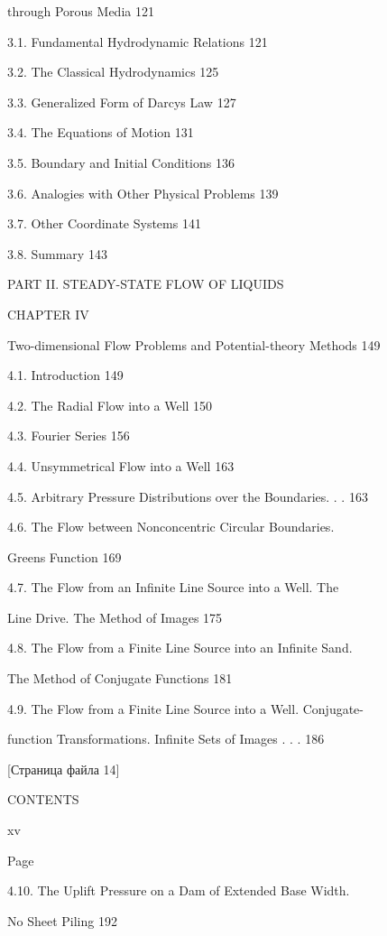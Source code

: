 \documentclass[
  11pt,
]{article}
\begin{document}
through Porous Media 121 \par
3.1. Fundamental Hydrodynamic Relations 121 \par
3.2. The Classical Hydrodynamics 125 \par
3.3. Generalized Form of Darcy\textquotesingle s Law 127 \par
3.4. The Equations of Motion 131 \par
3.5. Boundary and Initial Conditions 136 \par
3.6. Analogies with Other Physical Problems 139 \par
3.7. Other Coordinate Systems 141 \par
3.8. Summary 143 \par
PART II. STEADY-STATE FLOW OF LIQUIDS \par
CHAPTER IV \par
Two-dimensional Flow Problems and Potential-theory Methods 149 \par
4.1. Introduction 149 \par
4.2. The Radial Flow into a Well 150 \par
4.3. Fourier Series 156 \par
4.4. Unsymmetrical Flow into a Well 163 \par
4.5. Arbitrary Pressure Distributions over the Boundaries. . . 163 \par
4.6. The Flow between Nonconcentric Circular Boundaries. \par
Green\textquotesingle s Function 169 \par
4.7. The Flow from an Infinite Line Source into a Well. The \par
Line Drive. The Method of Images 175 \par
4.8. The Flow from a Finite Line Source into an Infinite Sand. \par
The Method of Conjugate Functions 181 \par
4.9. The Flow from a Finite Line Source into a Well. Conjugate- \par
function Transformations. Infinite Sets of Images . . . 186 \par
\smallskip
\smallskip
\smallskip
{[}Страница файла 14{]}\par
CONTENTS \par
xv \par
Page \par
4.10. The Uplift Pressure on a Dam of Extended Base Width. \par
No Sheet Piling 192 \par
\end{document}

